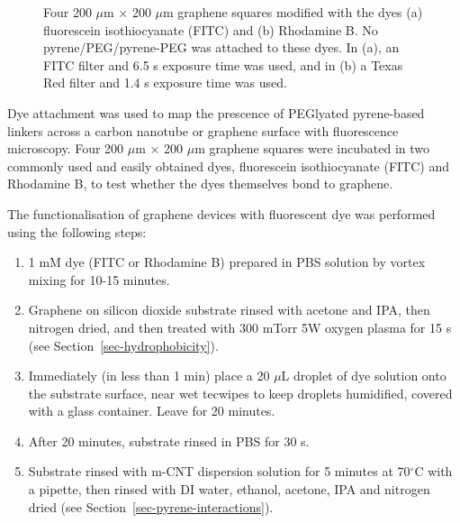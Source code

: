\documentclass[
  a4paper,
]{scrbook}
\begin{document}
\begin{figure}
\begin{minipage}[t]{0.47\linewidth}
{{}

}

\subcaption{\label{fig-rhodamine}}
\end{minipage}%

\caption{\label{fig-FITC-rhodamine-B}Four 200 \(\mu\)m \(\times\) 200
\(\mu\)m graphene squares modified with the dyes (a) fluorescein
isothiocyanate (FITC) and (b) Rhodamine B. No pyrene/PEG/pyrene-PEG was
attached to these dyes. In (a), an FITC filter and 6.5 s exposure time
was used, and in (b) a Texas Red filter and 1.4 s exposure time was
used.}

\end{figure}

Dye attachment was used to map the prescence of PEGlyated pyrene-based
linkers across a carbon nanotube or graphene surface with fluorescence
microscopy. Four 200 \(\mu\)m \(\times\) 200 \(\mu\)m graphene squares
were incubated in two commonly used and easily obtained dyes,
fluorescein isothiocyanate (FITC) and Rhodamine B, to test whether the
dyes themselves bond to graphene.

The functionalisation of graphene devices with fluorescent dye was
performed using the following steps:

\begin{enumerate}
\def\labelenumi{\arabic{enumi}.}
\item
  1 mM dye (FITC or Rhodamine B) prepared in PBS solution by vortex
  mixing for 10-15 minutes.
\item
  Graphene on silicon dioxide substrate rinsed with acetone and IPA,
  then nitrogen dried, and then treated with 300 mTorr 5W oxygen plasma
  for 15 s (see Section~\ref{sec-hydrophobicity}).
\item
  Immediately (in less than 1 min) place a 20 \(\mu\)L droplet of dye
  solution onto the substrate surface, near wet tecwipes to keep
  droplets humidified, covered with a glass container. Leave for 20
  minutes.
\item
  After 20 minutes, substrate rinsed in PBS for 30 s.
\item
  Substrate rinsed with m-CNT dispersion solution for 5 minutes at
  70\(^\circ\)C with a pipette, then rinsed with DI water, ethanol,
  acetone, IPA and nitrogen dried (see
  Section~\ref{sec-pyrene-interactions}).
\end{enumerate}
\end{document}

